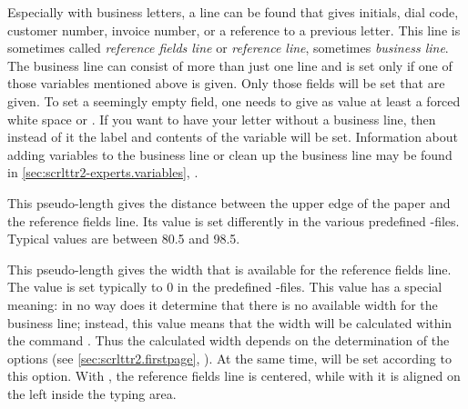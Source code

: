 Especially with business letters, a line can be found that gives initials,
dial code, customer number, invoice number, or a reference to a previous
letter.  This line is sometimes called \emph{reference fields line} or
\emph{reference line}, sometimes \emph{business line}. The business line can
consist of more than just one line and is set only if one of those variables
mentioned above is given. Only those fields will be set that are
given. To set a seemingly empty field, one needs to give as
value at least a forced white space or . If you want to have your
letter without a business line, then instead of it the label and contents of
the variable  will be set. Information about adding variables
to the business line or clean up the business line may be found in
\autoref{sec:scrlttr2-experts.variables},
.

\begin{Declaration}
\end{Declaration}
This pseudo-length gives the distance between the upper edge of the paper and
the reference fields line. Its value is set differently in the various
predefined
-files.
Typical values are between 80.5 and 98.5.
%
\EndIndexGroup


\begin{Declaration}
\end{Declaration}
This pseudo-length gives the width that is available for the reference fields
line.  The value is set typically to 0 in the predefined
-files.
This value has a special meaning: in no way does it
determine that there is no available width for the business line; instead,
this value means that the width will be calculated within the command
. Thus the calculated width depends on the
determination of the options %
 (see
\autoref{sec:scrlttr2.firstpage},
). At the same time,
 will be set according to this option. With
, the reference
fields line is centered, while with
 it is
aligned on the left inside the typing area.

